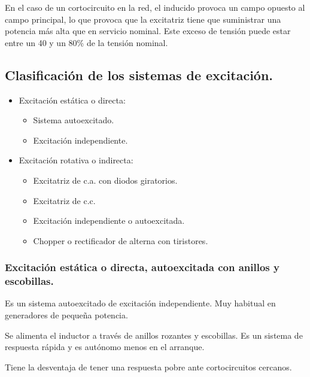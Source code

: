 			En el caso de un cortocircuito en la red, el inducido provoca un campo opuesto al campo principal, lo que provoca que la excitatriz tiene que suministrar una potencia más alta que en servicio nominal. Este exceso de tensión puede estar entre un 40 y un 80\% de la tensión nominal.
					
		\subsection{Clasificación de los sistemas de excitación.}
			\begin{itemize}
				\item Excitación estática o directa:
					\begin{itemize}
						\item Sistema autoexcitado.
						\item Excitación independiente.
					\end{itemize}
				\item Excitación rotativa o indirecta:
					\begin{itemize}
						\item Excitatriz de c.a. con diodos giratorios.
						\item Excitatriz de c.c.
						\item Excitación independiente o autoexcitada.
						\item Chopper o rectificador de alterna con tiristores.
					\end{itemize}
			\end{itemize}
		
			\newpage
			\subsubsection{Excitación estática o directa, autoexcitada con anillos y escobillas.}

						Es un sistema autoexcitado de excitación independiente. Muy habitual en generadores de pequeña potencia. 
						

						Se alimenta el inductor a través de anillos rozantes y escobillas. Es un sistema de respuesta rápida y es autónomo menos en el arranque. 
						

						Tiene la desventaja de tener una respuesta pobre ante cortocircuitos cercanos.

